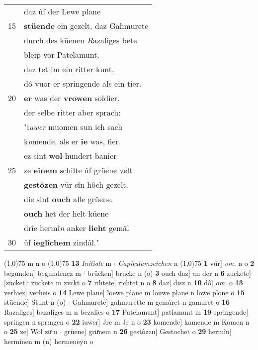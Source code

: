 \documentclass[8pt,a4paper,notitlepage]{article}
\begin{document}
\begin{table}[ht]
\begin{minipage}[t]{0.5\linewidth}
\begin{tabular}{rl}
 & daz ûf der Lewe plane\\ 
15 & \textbf{stüende} ein gezelt, daz Gahmurete\\ 
 & durch des küenen \textit{R}azaliges bete\\ 
 & bleip vor Patelamunt.\\ 
 & daz tet im ein ritter kunt.\\ 
 & dô vuor er springende als ein tier.\\ 
20 & \textbf{er} was der \textbf{vrowen} soldier.\\ 
 & der selbe ritter aber sprach:\\ 
 & "i\textit{uwer} muomen sun ich sach\\ 
 & k\textit{o}mende, als er \textbf{ie} was, fier.\\ 
 & ez sint \textbf{wol} hundert banier\\ 
25 & ze \textbf{einem} schilte ûf grüene velt\\ 
 & \textbf{gestôzen} vür sîn hôch gezelt.\\ 
 & die sint \textbf{ouch} alle grüene.\\ 
 & \textbf{ouch} het der helt küene\\ 
 & drîe hermî\textit{n} anker \textbf{lieht} gemâl\\ 
30 & ûf \textbf{ieglîchem} zindâl."\\ 
\end{tabular}
\scriptsize
\line(1,0){75} \newline
m n o \newline
\line(1,0){75} \newline
\textbf{13} \textit{Initiale} m   $\cdot$ \textit{Capitulumzeichen} n  \newline
\line(1,0){75} \newline
\textbf{1} vür] \textit{om.} n o \textbf{2} begunden] begundencz m  $\cdot$ brücken] brucke n (o) \textbf{3} ouch daz] an der n \textbf{6} zuckete] [zucket]: zuckete m zvckt o \textbf{7} rihtete] richtet n o \textbf{8} daz] disz n \textbf{10} dô] \textit{om.} o \textbf{13} verhiez] verheis o \textbf{14} Lewe plane] loewe plane m louwe plane n lowe plone o \textbf{15} stüende] Stunt n (o)  $\cdot$ Gahmurete] gahmurette m gemúret n gamuret o \textbf{16} Razaliges] bazaliges m n bezalies o \textbf{17} Patelamunt] patlamunt m \textbf{19} springende] springen n spr:ngen o \textbf{22} iuwer] Jre m Jr n o \textbf{23} komende] kamende m Komen n o \textbf{25} ze] Wol zuͯ n  $\cdot$ grüene] gruͯnem n \textbf{26} gestôzen] Gestochet o \textbf{29} hermîn] herminen m (n) hermeneẏn o \newline
\end{minipage}
\end{table}
\end{document}
